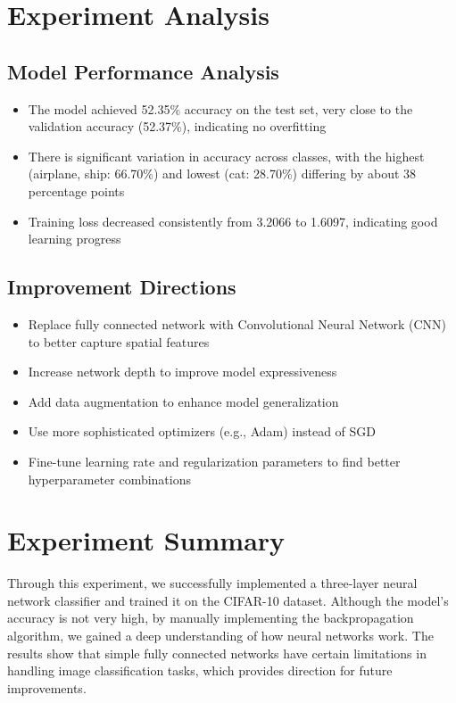 \documentclass[12pt]{article}
\begin{document}
\section{Experiment Analysis}

\subsection{Model Performance Analysis}
\begin{itemize}
    \item The model achieved 52.35\% accuracy on the test set, very close to the validation accuracy (52.37\%), indicating no overfitting
    \item There is significant variation in accuracy across classes, with the highest (airplane, ship: 66.70\%) and lowest (cat: 28.70\%) differing by about 38 percentage points
    \item Training loss decreased consistently from 3.2066 to 1.6097, indicating good learning progress
\end{itemize}

\subsection{Improvement Directions}
\begin{itemize}
    \item Replace fully connected network with Convolutional Neural Network (CNN) to better capture spatial features
    \item Increase network depth to improve model expressiveness
    \item Add data augmentation to enhance model generalization
    \item Use more sophisticated optimizers (e.g., Adam) instead of SGD
    \item Fine-tune learning rate and regularization parameters to find better hyperparameter combinations
\end{itemize}

\section{Experiment Summary}
Through this experiment, we successfully implemented a three-layer neural network classifier and trained it on the CIFAR-10 dataset. Although the model's accuracy is not very high, by manually implementing the backpropagation algorithm, we gained a deep understanding of how neural networks work. The results show that simple fully connected networks have certain limitations in handling image classification tasks, which provides direction for future improvements.
\end{document}
